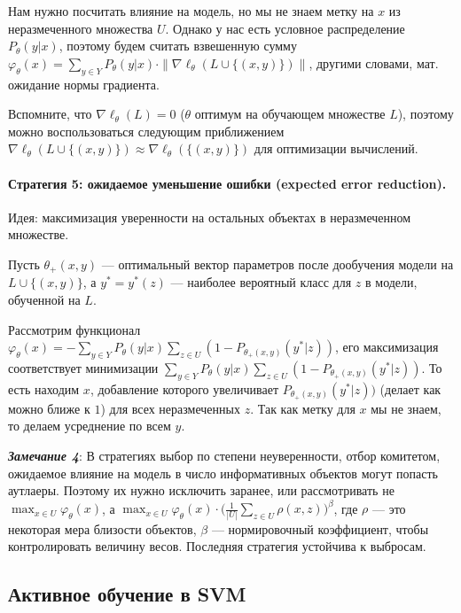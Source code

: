 \documentclass[specialist, 12pt, href]{article}
\begin{document}
Нам нужно посчитать влияние на модель, но мы не знаем метку на \(x\) из
неразмеченного множества \(U\). Однако у нас есть условное
распределение \(P_{\theta}(y|x)\), поэтому будем считать взвешенную
сумму
\(\varphi_{\theta}(x) = \sum_{y \in Y} P_{\theta}(y|x) \cdot \| \nabla\ell_{\theta}(L \cup \{(x, y)\})\|\),
другими словами, мат. ожидание нормы градиента.

Вспомните, что \(\nabla\ell_{\theta}(L) = 0\) (\(\theta\) оптимум на
обучающем множестве \(L\)), поэтому можно воспользоваться следующим
приближением
\(\nabla\ell_{\theta}(L \cup \{(x, y)\}) \approx \nabla\ell_{\theta}(\{(x, y)\})\)
для оптимизации вычислений.

\paragraph{Стратегия 5: ожидаемое уменьшение ошибки (expected error
reduction).}

Идея: максимизация уверенности на остальных объектах в неразмеченном
множестве.

Пусть \(\theta_+(x, y)\) --- оптимальный вектор параметров после
дообучения модели на \(L \cup \{(x, y)\}\), а \(y^* = y^*(z)\) ---
наиболее вероятный класс для \(z\) в модели, обученной на \(L\).

Рассмотрим функционал
\(\varphi_{\theta}(x) = - \sum_{y \in Y} P_{\theta}(y|x) \sum_{z \in U} (1 - P_{\theta_+(x, y)}(y^*|z))\),
его максимизация соответствует минимизации
\(\sum_{y \in Y} P_{\theta}(y|x) \sum_{z \in U} (1 - P_{\theta_+(x, y)}(y^*|z))\).
То есть находим \(x\), добавление которого увеличивает
\(P_{\theta_+(x, y)}(y^*|z))\) (делает как можно ближе к \(1\)) для всех
неразмеченных \(z\). Так как метку для \(x\) мы не знаем, то делаем
усреднение по всем \(y\).

\emph{\textbf{Замечание 4}}: В стратегиях выбор по степени неуверенности,
отбор комитетом, ожидаемое влияние на модель в число информативных
объектов могут попасть аутлаеры. Поэтому их нужно исключить заранее, или
рассмотривать не \(\max_{x \in U} \varphi_{\theta}(x)\), а
\(\max_{x \in U} \varphi_{\theta}(x)\cdot \big(\frac{1}{|U|}\sum_{z \in U}\rho(x, z)\big)^{\beta}\),
где \(\rho\) --- это некоторая мера близости объектов, \(\beta\) ---
нормировочный коэффициент, чтобы контролировать величину весов.
Последняя стратегия устойчива к выбросам.

\subsection{Активное обучение в
SVM}
\end{document}
